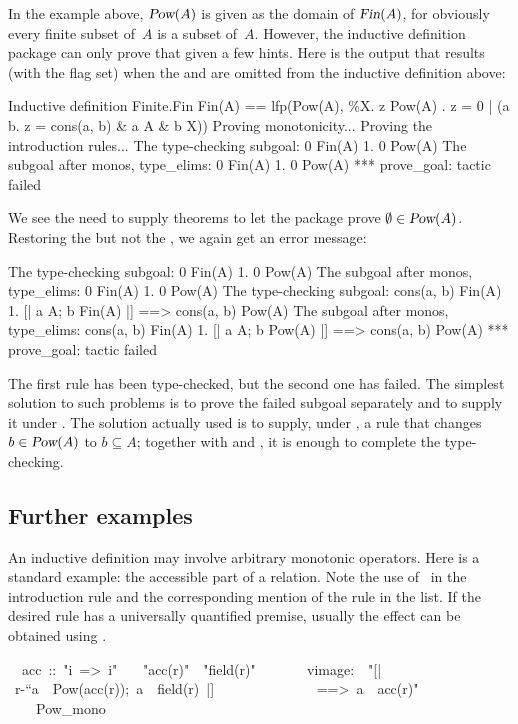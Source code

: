In the example above, $\emph{\sl Pow}(A)$ is given as the domain of
$\emph{\sl Fin}(A)$, for obviously every finite subset of~$A$ is a subset
of~$A$.  However, the inductive definition package can only prove that given a
few hints.
Here is the output that results (with the flag set) when the
 and  are omitted from the inductive
definition above:
\begin{ttbox}\isastyleminor
Inductive definition Finite.Fin
Fin(A) ==
lfp(Pow(A),
    \%X. {z \isasymin Pow(A) . z = 0 | ({\isasymexists}a b. z = cons(a, b) & a \isasymin A & b \isasymin X)})
  Proving monotonicity...
\ttbreak
  Proving the introduction rules...
The type-checking subgoal:
0 \isasymin Fin(A)
 1. 0 \isasymin Pow(A)
\ttbreak
The subgoal after monos, type_elims:
0 \isasymin Fin(A)
 1. 0 \isasymin Pow(A)
*** prove_goal: tactic failed
\end{ttbox}
We see the need to supply theorems to let the package prove
$\emptyset\in\emph{\sl Pow}(A)$.  Restoring the  but not the
, we again get an error message:
\begin{ttbox}\isastyleminor
The type-checking subgoal:
0 \isasymin Fin(A)
 1. 0 \isasymin Pow(A)
\ttbreak
The subgoal after monos, type_elims:
0 \isasymin Fin(A)
 1. 0 \isasymin Pow(A)
\ttbreak
The type-checking subgoal:
cons(a, b) \isasymin Fin(A)
 1. [| a \isasymin A; b \isasymin Fin(A) |] ==> cons(a, b) \isasymin Pow(A)
\ttbreak
The subgoal after monos, type_elims:
cons(a, b) \isasymin Fin(A)
 1. [| a \isasymin A; b \isasymin Pow(A) |] ==> cons(a, b) \isasymin Pow(A)
*** prove_goal: tactic failed
\end{ttbox}
The first rule has been type-checked, but the second one has failed.  The
simplest solution to such problems is to prove the failed subgoal separately
and to supply it under .  The solution actually used is
to supply, under , a rule that changes
$b\in\emph{\sl Pow}(A)$ to $b\subseteq A$; together with 
and , it is enough to complete the type-checking.



\subsection{Further examples}

An inductive definition may involve arbitrary monotonic operators.  Here is a
standard example: the accessible part of a relation.  Note the use
of~ in the introduction rule and the corresponding mention of the
rule  in the  list.  If the desired rule has a
universally quantified premise, usually the effect can be obtained using
.
\begin{isabelle}
\ \ acc\ ::\ "i\ =>\ i"\isanewline
{}\isanewline
\ \ \ "acc(r)"\ \isasymsubseteq \ "field(r)"\isanewline
\ \ \isanewline
\ \ \ \ vimage:\ \ "[|\ r-``\isacharbraceleft a\isacharbraceright\ \isasymin\ Pow(acc(r));\ a\ \isasymin \ field(r)\ |]
\isanewline
\ \ \ \ \ \ \ \ \ \ \ \ \ \ ==>\ a\ \isasymin \ acc(r)"\isanewline
\ \ \ \ Pow\_mono
\end{isabelle}

